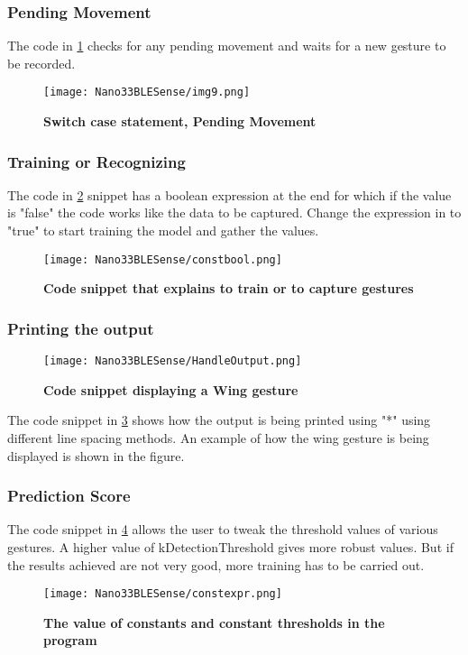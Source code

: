 \subsubsection{Pending Movement}
The code in \ref{fig:img9} checks for any pending movement and waits for a new gesture to be recorded.
\begin{figure}[h!]
    \texttt{[image: Nano33BLESense/img9.png]}
    \caption{\textbf{Switch case statement, Pending Movement}}
    \label{fig:img9}
\end{figure}

\subsubsection{Training or Recognizing} 
The code in \ref{fig:img10} snippet has a boolean expression at the end for which if the value is "false" the code works like the data to be captured. Change the expression in to "true" to start training the model and gather the values.

\begin{figure}[h!]
    \texttt{[image: Nano33BLESense/constbool.png]}
    \caption{\textbf{Code snippet that explains to train or to capture gestures}}
    \label{fig:img10}
\end{figure}


\subsubsection{Printing the output}


\begin{figure}[h!]
    \texttt{[image: Nano33BLESense/HandleOutput.png]}
    \caption{\textbf{Code snippet displaying a Wing gesture}}
    \label{fig:img12}
\end{figure}

The code snippet in \ref{fig:img12} shows how the output is being printed using "*" using different line spacing methods. An example of how the wing gesture is being displayed is shown in the figure.

\subsubsection{Prediction Score}
The code snippet in \ref{fig:img11}  allows the user to tweak the threshold values of various gestures. A higher value of kDetectionThreshold gives more robust values. But if the results achieved are not very good, more training has to be carried out.
\begin{figure}[h!]
    \texttt{[image: Nano33BLESense/constexpr.png]}
    \caption{\textbf{The value of constants and constant thresholds in the program}}
    \label{fig:img11}
\end{figure}

